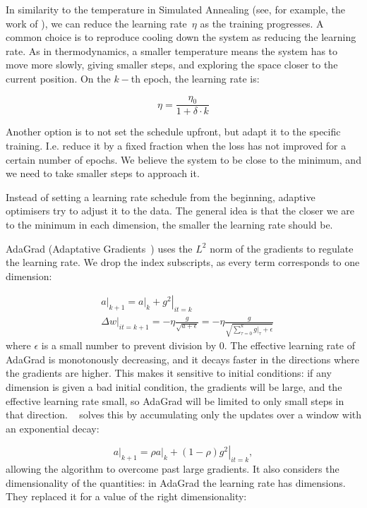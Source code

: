 In similarity to the temperature in Simulated Annealing (see, for example, the work of \citet{genSA}), 
we can reduce the learning rate~$\eta$ as the training progresses.
A common choice is to reproduce cooling down the system as reducing the learning rate.
As in thermodynamics, a smaller temperature means the system has to move more slowly, giving smaller steps, and exploring the space closer to the current position.
On the $k-$th epoch, the learning rate is:

\begin{equation}
\eta= \frac{\eta_0}{1 + \delta \cdot k}
\end{equation}

Another option is to not set the schedule upfront, but adapt it to the specific training.
I.e. reduce it by a fixed fraction when the loss has not improved for a certain number of epochs.
We believe the system to be close to the minimum, and we need to take smaller steps to approach it.

Instead of setting a learning rate schedule from the beginning, adaptive optimisers try to adjust it to the data.
The general idea is that the closer we are to the minimum in each dimension, the smaller the learning rate should be.

AdaGrad (Adaptative Gradients~\citep{adagrad}) uses the $L^2$ norm of the gradients to regulate the learning rate.
We drop the index subscripts, as every term corresponds to one dimension:

\begin{align*}
&\left.a\right|_{k+1} = \left. a\right|_{k} + \left.g^2\right|_{it=k}\\
&\left.\Delta w\right|_{it=k+1} = - \eta\frac{g}{\sqrt{a + \epsilon}} =  - \eta\frac{g}{\sqrt{\sum_{\tau=0}^{k} \left.g\right|_\tau + \epsilon}}
\end{align*}
where $\epsilon$ is a small number to prevent division by 0.
The effective learning rate of AdaGrad is monotonously decreasing, and it decays faster in the directions where the gradients are higher.
This makes it sensitive to initial conditions: if any dimension is given a bad initial condition, the gradients will be large, and the effective learning rate small, so AdaGrad will be limited to only small steps in that direction.
\ADADELTA~\citep{adadelta} solves this by accumulating only the updates over a window with an exponential decay:

\begin{equation*}
\left.a\right|_{k+1} = \rho \left. a\right|_{k} + (1-\rho) \left.g^2\right|_{it=k},
\end{equation*}
allowing the algorithm to overcome past large gradients.
It also considers the dimensionality of the quantities: in AdaGrad the learning rate has dimensions.
They replaced it for a value of the right dimensionality:

